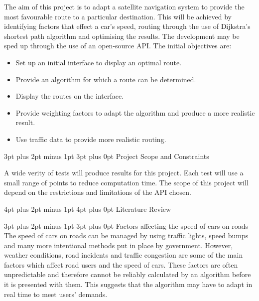 \documentclass[12pt,a4paper]{article}
\makeatletter
\renewcommand\subsection{\@startsection {subsection}{1}{0mm} %
                               {3pt plus 2pt minus 1pt} %
                               {3pt plus 0pt} %
                               {\normalfont\bfseries}}
\renewcommand\section{\@startsection {section}{1}{0mm} %
                               {4pt plus 2pt minus 1pt} %
                               {4pt plus 0pt} %
                               {\Large\bfseries}}
\makeatother
\begin{document}
The aim of this project is to adapt a satellite navigation system to provide the most favourable route to a particular destination. This will be achieved by identifying factors that effect a car’s speed, routing through the use of Dijkstra’s shortest path algorithm and optimising the results. The development may be sped up through the use of an open-source API.
The initial objectives are: 
\begin{itemize}
  \item 	Set up an initial interface to display an optimal route.
  \item Provide an algorithm for which a route can be determined.
  \item Display the routes on the interface.
  \item 	Provide weighting factors to adapt the algorithm and produce a more realistic result.
  \item Use traffic data to provide more realistic routing.
\end{itemize}	

\subsection{Project Scope and Constraints}

A wide verity of tests will produce results for this project. Each test will use a small range of points to reduce computation time. The scope of this project will depend on the restrictions and limitations of the API chosen. 



\newpage
\section{Literature Review}

\subsection{Factors affecting the speed of cars on roads}
The speed of cars on roads can be managed by using traffic lights, speed bumps and many more intentional methods put in place by government. However, weather conditions, road incidents and traffic congestion are some of the main factors which affect road users and the speed of cars. These factors are often unpredictable and therefore cannot be reliably calculated by an algorithm before it is presented with them. This suggests that the algorithm may have to adapt in real time to meet users’ demands.
\end{document}

